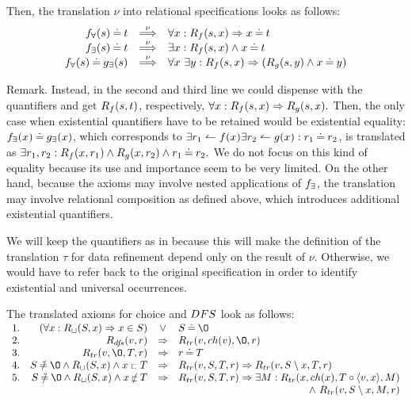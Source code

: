 Then, the translation $\nu$ into relational specifications looks as follows:
\begin{equation}\label{eq:relsnu}
\begin{array}{rcl}
\Bre f(s) \Eq t & \TTo{\nu} & \forall x: \Pre Rf(s,x)\impl x\Eq t \\ \Bree f(s) \Eq t & \TTo{\nu} & \exists x: \Pre Rf(s,x)\land x\Eq t\\ \Bre f(s) \Eq \Bree g(s) & \TTo{\nu} & \forall x\ \exists y : 
\Pre Rf(s,x)\impl (\Pre Rg(s,y)\land x\Eq y) \\ \end{array}
\end{equation}
\begin{SREMARK}{Remark.}
Instead, in the second and third line we could dispense with the quantifiers and get $R_{f}(s,t)$, respectively, $\forall x:R_{f}(s,x)\mathrel\Rightarrow R_{g}(s,x).$
Then, the
only case when existential quantifiers have to be retained would be existential
equality:
$f_\exists(x)\mathbin{\doteq} g_\exists(x)$, which corresponds to $\exists r_1\leftharpoonup f(x) \exists r_2\leftharpoonup g(x): r_1\mathbin{\doteq} r_2$, is translated as $\exists r_1,r_2 : R_{f}(x,r_1)\land R_{g}(x,r_2)\land r_1\mathbin{\doteq} r_2.$ We do not focus on this kind of equality because its use and importance seem to be very limited.
On the other hand, because the axioms may involve nested applications of $f_\exists$,
the translation may involve relational composition as defined above, which introduces additional existential quantifiers. 

We will keep the quantifiers as in  because this will make the definition of the translation $\tau$ for data refinement depend only on the result of $\nu$. Otherwise, we would have to refer back to the original specification in order to identify existential and universal occurrences. \end{SREMARK}
The translated axioms for choice and $DFS$ look as follows:\\[1ex] \(\begin{array}{rrcl}
1.& (\forall x:\Pre R\ch(S,x) \impl x\in S) &\lor & S\Eq\es \\ 2. & \Pre R{\dfs}(v,r) & \impl & \Pre R{tr}(v,ch(v),\es,r) \\ 3. & \Pre R{tr}(v,\es,T,r) & \impl & r\Eq T \\ 4. & S\Not\Eq\es\land\Pre R\ch(S,x)\land x\lin T & \impl & 
\Pre R{tr}(v,S,T,r)\impl\Pre R{tr}(v,S\setminus x,T,r) \\ 5. & S\Not\Eq\es\land\Pre R\ch(S,x)\land x\Not\lin T & \impl & 
\Pre R{tr}(v,S,T,r)\impl
\exists M: \Pre R{tr}(x,ch(x),T\ap\<v,x\>,M)\\ \multicolumn{4}{r}{\land\ \Pre R{tr}(v,S\setminus x,M,r)} \end{array} \)\\[1ex]
